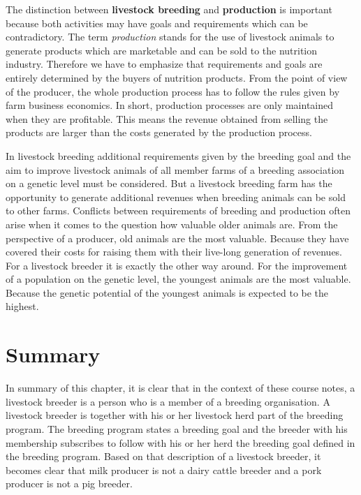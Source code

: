 \documentclass[
]{book}
\begin{document}
The distinction between \textbf{livestock breeding} and \textbf{production} is important because both activities may have goals and requirements which can be contradictory. The term \emph{production} stands for the use of livestock animals to generate products which are marketable and can be sold to the nutrition industry. Therefore we have to emphasize that requirements and goals are entirely determined by the buyers of nutrition products. From the point of view of the producer, the whole production process has to follow the rules given by farm business economics. In short, production processes are only maintained when they are profitable. This means the revenue obtained from selling the products are larger than the costs generated by the production process.

In livestock breeding additional requirements given by the breeding goal and the aim to improve livestock animals of all member farms of a breeding association on a genetic level must be considered. But a livestock breeding farm has the opportunity to generate additional revenues when breeding animals can be sold to other farms. Conflicts between requirements of breeding and production often arise when it comes to the question how valuable older animals are. From the perspective of a producer, old animals are the most valuable. Because they have covered their costs for raising them with their live-long generation of revenues. For a livestock breeder it is exactly the other way around. For the improvement of a population on the genetic level, the youngest animals are the most valuable. Because the genetic potential of the youngest animals is expected to be the highest.

\hypertarget{gel-intro-summary}{%
\section{Summary}\label{gel-intro-summary}}

In summary of this chapter, it is clear that in the context of these course notes, a livestock breeder is a person who is a member of a breeding organisation. A livestock breeder is together with his or her livestock herd part of the breeding program. The breeding program states a breeding goal and the breeder with his membership subscribes to follow with his or her herd the breeding goal defined in the breeding program. Based on that description of a livestock breeder, it becomes clear that milk producer is not a dairy cattle breeder and a pork producer is not a pig breeder.
\end{document}
